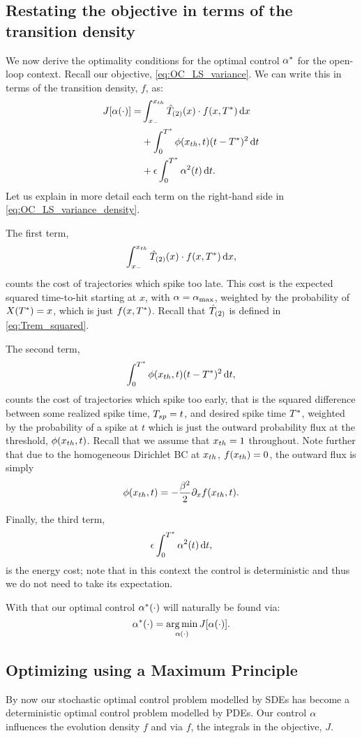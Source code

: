 \subsection{Restating the objective in terms of the transition density}
We now derive the optimality conditions for the optimal control $\alpha^*$ for the
open-loop context. Recall our objective, \cref{eq:OC_LS_variance}.  
We can write this in terms of the transition density, $f$, as:
\begin{align}
J[\alpha(\cdot)] =&
\int_{ x_{-} }^{ x_{th} } { \hat{T}_{(2)} }(x) \cdot f(x,{ T^* }) \, \mathrm{d} x
\notag
\\
&+ \int_0^{ T^* } \phi({ x_{th} }, t) (t-{ T^* })^2 \, \mathrm{d} t
\label{eq:OC_LS_variance_density}
\\
&+  {\epsilon} \int_0^{ T^* }  \alpha^2(t)  \, \mathrm{d} t.
\notag
\end{align}
Let us explain in more detail each term on the right-hand side in
\cref{eq:OC_LS_variance_density}.

The first term, $$ \int_{ x_{-} }^{ x_{th} } { \hat{T}_{(2)} }(x) \cdot f(x,{ T^* })\, \mathrm{d} x, $$ counts the
cost of trajectories which spike too late. This cost is the expected squared time-to-hit starting at $x$, with  $\alpha = { \alpha_{\textrm{max}} }$, weighted by the
probability of $X({ T^* }) = x$, which is just $f(x,{ T^* })$. Recall that ${ \hat{T}_{(2)} }$ is
defined in \cref{eq:Trem_squared}.

The second term, $$ \int_0^{ T^* } \phi({ x_{th} },t) (t-{ T^* })^2 \, \mathrm{d} t, $$ counts the cost
of trajectories which spike too early, that is the squared difference between
some realized spike time, $T_{sp} = t$, and desired spike time ${ T^* }$, weighted by
the probability of a spike at $t$ which is just the outward probability flux at
the threshold, $\phi({ x_{th} },t)$. Recall that we assume that ${ x_{th} } = 1$ throughout.
Note further that due to the homogeneous Dirichlet BC at ${ x_{th} }$, $f({ x_{th} }) = 0$, the outward flux is simply $$ \phi({ x_{th} }, t) = -\frac{\beta^2 }{2} {\partial}_x f({ x_{th} },
t).$$

Finally, the third term,
$$ {\epsilon} \int_0^{ T^* } \alpha^2(t) \, \mathrm{d} t, $$
is the energy cost; note that in this context the control is deterministic and
thus we do not need to take its expectation. 

With that our optimal control $\alpha^*(\cdot)$ will naturally be found via:
$$
\a^*(\cdot) = \argmin_{\a(\cdot)} J[\a(\cdot)].
$$

\subsection{Optimizing using a Maximum Principle}
\label{sec:PDE_max_principle_for_pdf}
By now our stochastic optimal control problem modelled by SDEs
has become a deterministic optimal control problem modelled by PDEs. Our control
$\alpha$ influences the evolution density $f$ and via $f$, the integrals in the
objective, $J$.

